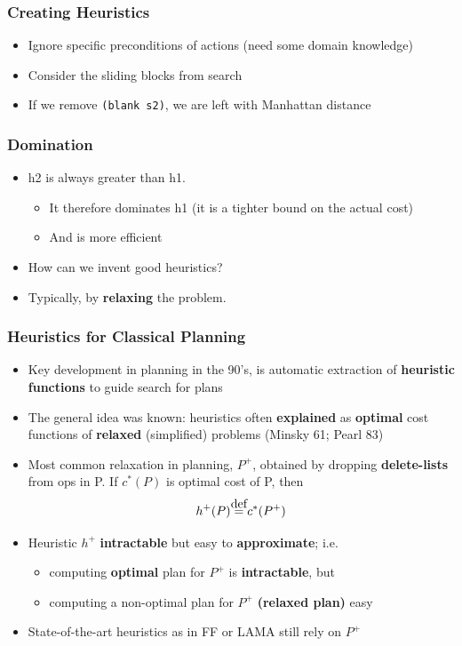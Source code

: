 \documentclass{beamer}
\newcommand\myeq{\stackrel{\mathclap{\normalfont\mbox{def}}}{=}}
\begin{document}
	\begin{frame}[c]\frametitle{Creating Heuristics}
		\begin{itemize}
			\item Ignore specific preconditions of actions (need some domain knowledge)
			\item Consider the sliding blocks from search
		\end{itemize}
		
		\begin{itemize}
			\item If we remove \texttt{(blank s2)}, we are left with Manhattan distance
		\end{itemize}
	\end{frame}
	
	\begin{frame}[c]\frametitle{Domination}
		\begin{itemize}
			\item h2 is always greater than h1. 
			\begin{itemize}
				\item It therefore dominates h1 (it is a tighter bound on the actual cost)
				\item And is more efficient
			\end{itemize}
			\item How can we invent good heuristics?
			\item Typically, by \textbf{relaxing} the problem.
		\end{itemize}
	\end{frame}

	\begin{frame}[c]\frametitle{Heuristics for Classical Planning}
		\begin{itemize}
			\item Key development in planning in the 90’s, is automatic extraction of \textbf{heuristic functions} to guide search for plans 
			\item The general idea was known: heuristics often \textbf{explained} as \textbf{optimal} cost functions of \textbf{relaxed} (simplified) problems (Minsky 61; Pearl 83)
			\item Most common relaxation in planning, $P^+$, obtained by dropping \textbf{delete-lists} from ops in P. If $c^*(P)$ is optimal cost of P, then
			$$h^{+}(P) \myeq c^{*}(P^{+})$$
			\item Heuristic $h^{+}$ \textbf{intractable} but easy to \textbf{approximate}; i.e. 
			\begin{itemize}
				\item computing \textbf{optimal} plan for $P^{+}$ is \textbf{intractable}, but 
				\item computing a non-optimal plan for $P^{+}$ \textbf{(relaxed plan)} easy 
			\end{itemize}
			\item State-of-the-art heuristics as in FF or LAMA still rely on $P^{+}$
		\end{itemize}
	\end{frame}
	
\end{document}

